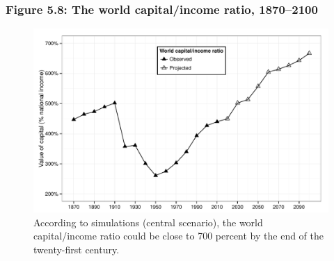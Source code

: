 \documentclass[t]{beamer}\usepackage[]{graphicx}\usepackage[]{color}
\newenvironment{knitrout}{}{} %
\begin{document}
\begin{frame}[label=Figure_5_8]
\frametitle{Figure 5.8: The world capital/income ratio, 1870--2100}
\begin{figure}[t]
\begin{minipage}[b]{\textwidth}
\centering
\begin{knitrout}\footnotesize
{}\color{fgcolor}

{\centering \includegraphics[width=1\linewidth]{figures/bw/Figure_5_8} 

}



\end{knitrout}
\caption{According to simulations (central scenario), the world capital/income ratio could be close to 700 percent by the end of the twenty-first century.}
\end{minipage}
\end{figure}
\end{frame}
\end{document}
